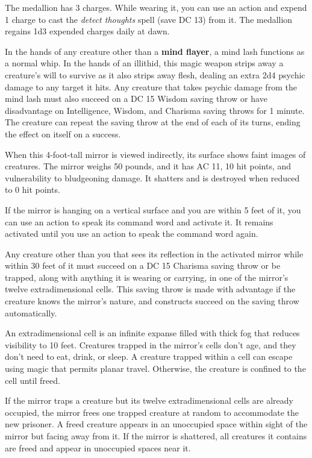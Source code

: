 \documentclass[10pt,a4paper,twoside,bg=print,twocolumn,openany,nodeprecatedcode]{dndbook}
\begin{document}
The medallion has 3 charges. While wearing it, you can use an action and expend 1 charge to cast the \textit{detect thoughts} spell (save DC 13) from it. The medallion regains 1d3 expended charges daily at dawn.

In the hands of any creature other than a \textbf{mind flayer}, a mind lash functions as a normal whip. In the hands of an illithid, this magic weapon strips away a creature's will to survive as it also strips away flesh, dealing an extra 2d4 psychic damage to any target it hits. Any creature that takes psychic damage from the mind lash must also succeed on a DC 15 Wisdom saving throw or have disadvantage on Intelligence, Wisdom, and Charisma saving throws for 1 minute. The creature can repeat the saving throw at the end of each of its turns, ending the effect on itself on a success.

When this 4-foot-tall mirror is viewed indirectly, its surface shows faint images of creatures. The mirror weighs 50 pounds, and it has AC 11, 10 hit points, and vulnerability to bludgeoning damage. It shatters and is destroyed when reduced to 0 hit points.

If the mirror is hanging on a vertical surface and you are within 5 feet of it, you can use an action to speak its command word and activate it. It remains activated until you use an action to speak the command word again.

Any creature other than you that sees its reflection in the activated mirror while within 30 feet of it must succeed on a DC 15 Charisma saving throw or be trapped, along with anything it is wearing or carrying, in one of the mirror's twelve extradimensional cells. This saving throw is made with advantage if the creature knows the mirror's nature, and constructs succeed on the saving throw automatically.

An extradimensional cell is an infinite expanse filled with thick fog that reduces visibility to 10 feet. Creatures trapped in the mirror's cells don't age, and they don't need to eat, drink, or sleep. A creature trapped within a cell can escape using magic that permits planar travel. Otherwise, the creature is confined to the cell until freed.

If the mirror traps a creature but its twelve extradimensional cells are already occupied, the mirror frees one trapped creature at random to accommodate the new prisoner. A freed creature appears in an unoccupied space within sight of the mirror but facing away from it. If the mirror is shattered, all creatures it contains are freed and appear in unoccupied spaces near it.
\end{document}
